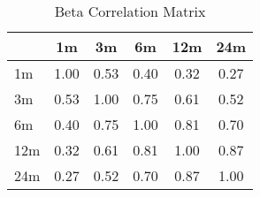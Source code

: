 \begin{table}

\caption{Beta Correlation Matrix}
\centering
\begin{tabular}[t]{l|c|c|c|c|c}
\hline
  & 1m & 3m & 6m & 12m & 24m\\
\hline
1m & 1.00 & 0.53 & 0.40 & 0.32 & 0.27\\
\hline
3m & 0.53 & 1.00 & 0.75 & 0.61 & 0.52\\
\hline
6m & 0.40 & 0.75 & 1.00 & 0.81 & 0.70\\
\hline
12m & 0.32 & 0.61 & 0.81 & 1.00 & 0.87\\
\hline
24m & 0.27 & 0.52 & 0.70 & 0.87 & 1.00\\
\hline
\end{tabular}
\end{table}
